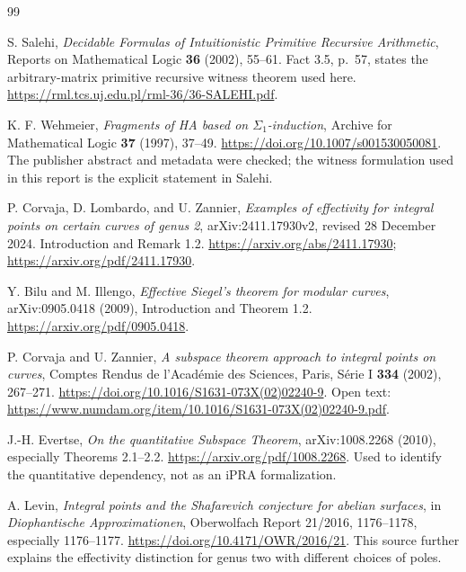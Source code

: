 \begingroup\small
\begin{thebibliography}{99}

S. Salehi,
\emph{Decidable Formulas of Intuitionistic Primitive Recursive Arithmetic},
Reports on Mathematical Logic \textbf{36} (2002), 55--61.
Fact 3.5, p.~57, states the arbitrary-matrix primitive recursive
witness theorem used here.
\url{https://rml.tcs.uj.edu.pl/rml-36/36-SALEHI.pdf}.

K. F. Wehmeier,
\emph{Fragments of HA based on $\Sigma_1$-induction},
Archive for Mathematical Logic \textbf{37} (1997), 37--49.
\url{https://doi.org/10.1007/s001530050081}.
The publisher abstract and metadata were checked; the witness formulation
used in this report is the explicit statement in Salehi.

P. Corvaja, D. Lombardo, and U. Zannier,
\emph{Examples of effectivity for integral points on certain curves of genus 2},
arXiv:2411.17930v2, revised 28 December 2024.
Introduction and Remark 1.2.
\url{https://arxiv.org/abs/2411.17930};
\url{https://arxiv.org/pdf/2411.17930}.

Y. Bilu and M. Illengo,
\emph{Effective Siegel's theorem for modular curves},
arXiv:0905.0418 (2009), Introduction and Theorem 1.2.
\url{https://arxiv.org/pdf/0905.0418}.

P. Corvaja and U. Zannier,
\emph{A subspace theorem approach to integral points on curves},
Comptes Rendus de l'Acad\'emie des Sciences, Paris, S\'erie I
\textbf{334} (2002), 267--271.
\url{https://doi.org/10.1016/S1631-073X(02)02240-9}.
Open text:
\url{https://www.numdam.org/item/10.1016/S1631-073X(02)02240-9.pdf}.

J.-H. Evertse,
\emph{On the quantitative Subspace Theorem},
arXiv:1008.2268 (2010), especially Theorems 2.1--2.2.
\url{https://arxiv.org/pdf/1008.2268}.
Used to identify the quantitative dependency, not as an iPRA formalization.

A. Levin,
\emph{Integral points and the Shafarevich conjecture for abelian surfaces},
in \emph{Diophantische Approximationen},
Oberwolfach Report 21/2016, 1176--1178, especially 1176--1177.
\url{https://doi.org/10.4171/OWR/2016/21}.
This source further explains the effectivity distinction for genus two
with different choices of poles.


\end{thebibliography}
